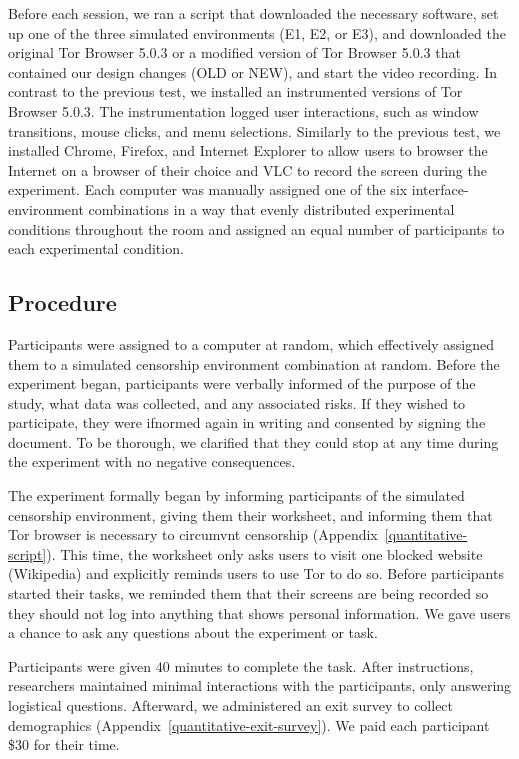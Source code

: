 \documentclass[USenglish,oneside,twocolumn]{article}
\begin{document}
Before each session, we ran a script that downloaded the necessary software, set up one of the three simulated environments (E1, E2, or E3), and downloaded the original Tor Browser 5.0.3 or a modified version of Tor Browser 5.0.3 that contained our design changes (OLD or NEW), and start the video recording. In contrast to the previous test, we installed an instrumented versions of Tor Browser 5.0.3. The instrumentation logged user interactions, such as window transitions, mouse clicks, and menu selections. Similarly to the previous test, we installed Chrome, Firefox, and Internet Explorer to allow users to browser the Internet on a browser of their choice and VLC to record the screen during the experiment. Each computer was manually assigned one of the six interface-environment combinations in a way that evenly distributed experimental conditions throughout the room and assigned an equal number of participants to each experimental condition.

\subsection{Procedure}
Participants were assigned to a computer at random, which effectively assigned them to a simulated censorship environment combination at random. Before the experiment began, participants were verbally informed of the purpose of the study, what data was collected, and any associated risks. If they wished to participate, they were ifnormed again in writing and consented by signing the document. To be thorough, we clarified that they could stop at any time during the experiment with no negative consequences. 

The experiment formally began by informing participants of the simulated censorship environment, giving them their worksheet, and informing them that Tor browser is necessary to circumvnt censorship (Appendix~\ref{quantitative-script}). This time, the worksheet only asks users to visit one blocked website (Wikipedia) and explicitly reminds users to use Tor to do so. Before participants started their tasks, we reminded them that their screens are being recorded so they should not log into anything that shows personal information. We gave users a chance to ask any questions about the experiment or task. 

Participants were given 40 minutes to complete the task. After instructions, researchers maintained minimal interactions with the participants, only answering logistical questions. Afterward, we administered an exit survey to collect demographics (Appendix~\ref{quantitative-exit-survey}). We paid each participant \$30 for their time. 
\end{document}
